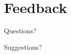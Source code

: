 \documentclass{beamer}
\begin{document}
\section{Feedback}
	\begin{frame}
		\begin{block}{}
			\Huge{\centerline{Questions?}}
		\end{block}
		\begin{block}{}
			\Huge{\centerline{Suggestions?}}
		\end{block}
	\end{frame}

\end{document}
